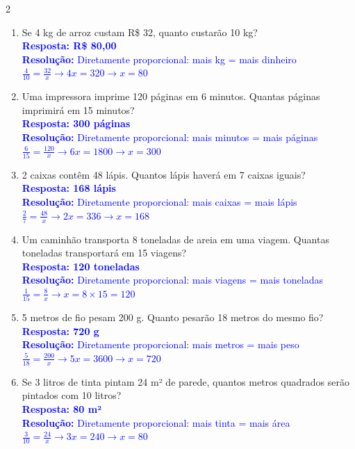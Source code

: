 \documentclass[11pt]{article}
\begin{document}
\begin{multicols}{2}
\begin{enumerate}[leftmargin=*, itemsep=2pt]
\item Se 4 kg de arroz custam R\$ 32, quanto custarão 10 kg? \\
\textcolor{blue}{\textbf{Resposta: R\$ 80,00}} \\
\textcolor{blue}{\textbf{Resolução:} Diretamente proporcional: mais kg = mais dinheiro} \\
\textcolor{blue}{$\frac{4}{10} = \frac{32}{x} \rightarrow 4x = 320 \rightarrow x = 80$}

\item Uma impressora imprime 120 páginas em 6 minutos. Quantas páginas imprimirá em 15 minutos? \\
\textcolor{blue}{\textbf{Resposta: 300 páginas}} \\
\textcolor{blue}{\textbf{Resolução:} Diretamente proporcional: mais minutos = mais páginas} \\
\textcolor{blue}{$\frac{6}{15} = \frac{120}{x} \rightarrow 6x = 1800 \rightarrow x = 300$}

\item 2 caixas contêm 48 lápis. Quantos lápis haverá em 7 caixas iguais? \\
\textcolor{blue}{\textbf{Resposta: 168 lápis}} \\
\textcolor{blue}{\textbf{Resolução:} Diretamente proporcional: mais caixas = mais lápis} \\
\textcolor{blue}{$\frac{2}{7} = \frac{48}{x} \rightarrow 2x = 336 \rightarrow x = 168$}

\item Um caminhão transporta 8 toneladas de areia em uma viagem. Quantas toneladas transportará em 15 viagens? \\
\textcolor{blue}{\textbf{Resposta: 120 toneladas}} \\
\textcolor{blue}{\textbf{Resolução:} Diretamente proporcional: mais viagens = mais toneladas} \\
\textcolor{blue}{$\frac{1}{15} = \frac{8}{x} \rightarrow x = 8 \times 15 = 120$}

\item 5 metros de fio pesam 200 g. Quanto pesarão 18 metros do mesmo fio? \\
\textcolor{blue}{\textbf{Resposta: 720 g}} \\
\textcolor{blue}{\textbf{Resolução:} Diretamente proporcional: mais metros = mais peso} \\
\textcolor{blue}{$\frac{5}{18} = \frac{200}{x} \rightarrow 5x = 3600 \rightarrow x = 720$}

\item Se 3 litros de tinta pintam 24 m² de parede, quantos metros quadrados serão pintados com 10 litros? \\
\textcolor{blue}{\textbf{Resposta: 80 m²}} \\
\textcolor{blue}{\textbf{Resolução:} Diretamente proporcional: mais tinta = mais área} \\
\textcolor{blue}{$\frac{3}{10} = \frac{24}{x} \rightarrow 3x = 240 \rightarrow x = 80$}


\end{enumerate}
\end{multicols}
\end{document}
